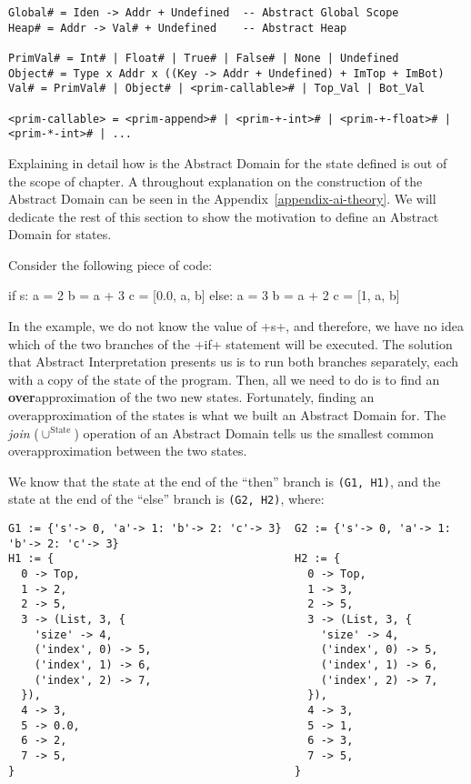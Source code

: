 \begin{verbatim}
Global# = Iden -> Addr + Undefined  -- Abstract Global Scope
Heap# = Addr -> Val# + Undefined    -- Abstract Heap

PrimVal# = Int# | Float# | True# | False# | None | Undefined
Object# = Type x Addr x ((Key -> Addr + Undefined) + ImTop + ImBot)
Val# = PrimVal# | Object# | <prim-callable># | Top_Val | Bot_Val

<prim-callable> = <prim-append># | <prim-+-int># | <prim-+-float># | <prim-*-int># | ...
\end{verbatim}

Explaining in detail how is the Abstract Domain for the state defined is out of the scope
of chapter. A throughout explanation on the construction of the Abstract Domain can be
seen in the Appendix~\ref{appendix-ai-theory}. We will dedicate the rest of this section
to show the motivation to define an Abstract Domain for states.

Consider the following piece of code:

\begin{pythoncode}
if s:
  a = 2
  b = a + 3
  c = [0.0, a, b]
else:
  a = 3
  b = a + 2
  c = [1, a, b]
\end{pythoncode}

In the example, we do not know the value of \pycode+s+, and therefore, we have no idea
which of the two branches of the \pycode+if+ statement will be executed. The solution that
Abstract Interpretation presents us is to run both branches separately, each with a copy
of the state of the program. Then, all we need to do is to find an
\textbf{over}approximation of the two new states. Fortunately, finding an
overapproximation of the states is what we built an Abstract Domain for. The
\textit{join} ($\cup^{\text{State}}$) operation of an Abstract Domain tells us the
smallest common overapproximation between the two states.

We know that the state at the end of the \enquote{then} branch is \verb|(G1, H1)|, and the
state at the end of the \enquote{else} branch is \verb|(G2, H2)|, where:

\begin{verbatim}
G1 := {'s'-> 0, 'a'-> 1: 'b'-> 2: 'c'-> 3}  G2 := {'s'-> 0, 'a'-> 1: 'b'-> 2: 'c'-> 3}
H1 := {                                     H2 := {
  0 -> Top,                                   0 -> Top,
  1 -> 2,                                     1 -> 3,
  2 -> 5,                                     2 -> 5,
  3 -> (List, 3, {                            3 -> (List, 3, {
    'size' -> 4,                                'size' -> 4,
    ('index', 0) -> 5,                          ('index', 0) -> 5,
    ('index', 1) -> 6,                          ('index', 1) -> 6,
    ('index', 2) -> 7,                          ('index', 2) -> 7,
  }),                                         }),
  4 -> 3,                                     4 -> 3,
  5 -> 0.0,                                   5 -> 1,
  6 -> 2,                                     6 -> 3,
  7 -> 5,                                     7 -> 5,
}                                           }
\end{verbatim}

